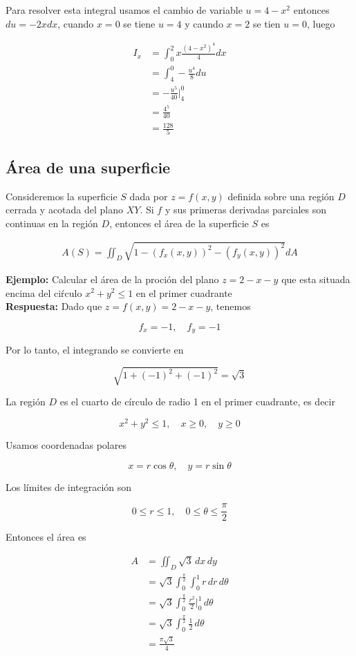 \documentclass{article}
\theoremstyle{definition}
\begin{document}
Para resolver esta integral usamos el cambio de variable $u=4-x^2$ entonces $du=-2xdx$, cuando $x=0$ se tiene $u=4$ y caundo $x=2$ se tien $u=0$, luego


\begin{align*}
    I_x &= \int_{0}^2 x\frac{(4-x^2)^4}{4} dx \\
    &= \int_{4}^0 -\frac{u^4}{8} du \\
    &= -\frac{u^5}{40}\bigg|_4^0 \\
    &=\frac{4^5}{40} \\
    &= \frac{128}{5}
\end{align*}


\newpage


\subsection{Área de una superficie}

Consideremos la superficie $S$ dada por $z=f(x,y)$ definida sobre una regi\'on  $D$ cerrada y acotada del plano $XY$. Si $f$ y sus primeras derivadas parciales son continuas en la regi\'on $D$, entonces el \'area de la superficie $S$ es

\begin{align*}
    A(S) = \iint_{D} \sqrt{1-(f_x(x,y))^2-(f_y(x,y))^2} dA
\end{align*}


\textbf{Ejemplo: } Calcular el \'area de la proci\'on del plano $z=2-x-y$ que esta situada encima del ci\'rculo $x^2+y^2 \leq 1$ en el primer cuadrante \\

\textbf{Respuesta: } Dado que \( z = f(x,y)= 2 - x - y \), tenemos

\[
f_x = -1, \quad f_y = -1
\]

Por lo tanto, el integrando se convierte en

\[
\sqrt{1 + (-1)^2 + (-1)^2} = \sqrt{3}
\]

La región \( D \) es el cuarto de círculo de radio 1 en el primer cuadrante, es decir

\[
x^2 + y^2 \leq 1, \quad x \geq 0, \quad y \geq 0
\]

Usamos coordenadas polares

\[
x = r \cos \theta, \quad y = r \sin \theta
\]

Los límites de integración son

\[
0 \leq r \leq 1, \quad 0 \leq \theta \leq \frac{\pi}{2}
\]

Entonces el área es

\begin{align*}
    A &=  \iint_D \sqrt{3} \, dx\,dy \\
    &=  \sqrt{3} \int_0^{\frac{\pi}{2}} \int_0^1 r\,dr\,d\theta \\
    &=  \sqrt{3} \int_0^{\frac{\pi}{2}}  \frac{r^2}{2} \bigg|_0^1 \, d\theta \\
    &= \sqrt{3} \int_0^{\frac{\pi}{2}} \frac{1}{2} \, d\theta \\
    &= \frac{\pi \sqrt{3}}{4}
\end{align*}
\end{document}
